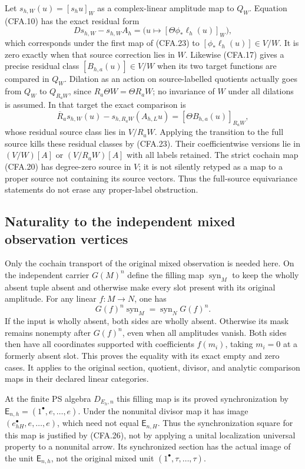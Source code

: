 Let $s_{h,W}(u)=[s_hu]_W$ as a complex-linear amplitude map to
$Q_W$.  Equation (CFA.10) has the exact residual form
\[
 D s_{h,W}-s_{h,W}A_h
   =\bigl(u\mapsto[\Theta\phi_*\ell_h(u)]_W\bigr),            \tag{CFA.24}
\]
which corresponds under the first map of (CFA.23) to
$[\phi_*\ell_h(u)]\in V/W$.  It is zero exactly when that
source correction lies in $W$.  Likewise (CFA.17) gives a precise
residual class $[B_{h,a}(u)]\in V/W$ when its two target functions
are compared in $Q_W$.  Dilation as an action on source-labelled
quotients actually goes from $Q_W$ to $Q_{R_aW}$, since
$R_a\Theta W=\Theta R_aW$; no invariance of $W$ under all dilations
is assumed.  In that target the exact comparison is
\[
 \overline R_a s_{h,W}(u)-s_{h,R_aW}(A_{h,L}u)
             =[\Theta B_{h,a}(u)]_{R_aW},                    \tag{CFA.25}
\]
whose residual source class lies in $V/R_aW$.
Applying the transition to the full source kills these residual
classes by (CFA.23).  Their coefficientwise versions lie in
$(V/W)[A]$ or $(V/R_aW)[A]$ with all labels retained.
The strict cochain map (CFA.20) has degree-zero source in $V$;
it is not silently retyped as a map to a proper source not containing
its source vectors.  Thus the full-source equivariance statements
do not erase any proper-label obstruction.

\subsection{Naturality to the independent mixed observation vertices}

Only the cochain transport of the original mixed observation is needed
here.  On the independent carrier $G(M)^n$ define the filling map
$\operatorname{syn}_M$ to keep the wholly absent tuple absent and
otherwise make every slot present with its original amplitude.
For any linear $f:M\to N$, one has
\[
 G(f)^n\operatorname{syn}_M
       =\operatorname{syn}_N G(f)^n.                          \tag{CFA.26}
\]
If the input is wholly absent, both sides are wholly absent.
Otherwise its mask remains nonempty after $G(f)^n$, even when all
amplitudes vanish.  Both sides then have all coordinates supported
with coefficients $f(m_i)$, taking $m_i=0$ at a formerly absent
slot.  This proves the equality with its exact empty and zero cases.
It applies to the original section, quotient, divisor, and analytic
comparison maps in their declared linear categories.

At the finite PS algebra $D_{E_h,n}$ this filling map is its proved
synchronization by $\mathsf E_{n,h}=(1^\bullet,e,\ldots,e)$.
Under the nonunital divisor map it has image
$(e_{hH}^\bullet,e,\ldots,e)$, which need not equal
$\mathsf E_{n,H}$.  Thus the synchronization square for this map
is justified by (CFA.26), not by applying a unital localization
universal property to a nonunital arrow.  Its synchronized section
has the actual image of the unit $\mathsf E_{n,h}$, not the original
mixed unit $(1^\bullet,\tau,\ldots,\tau)$.

